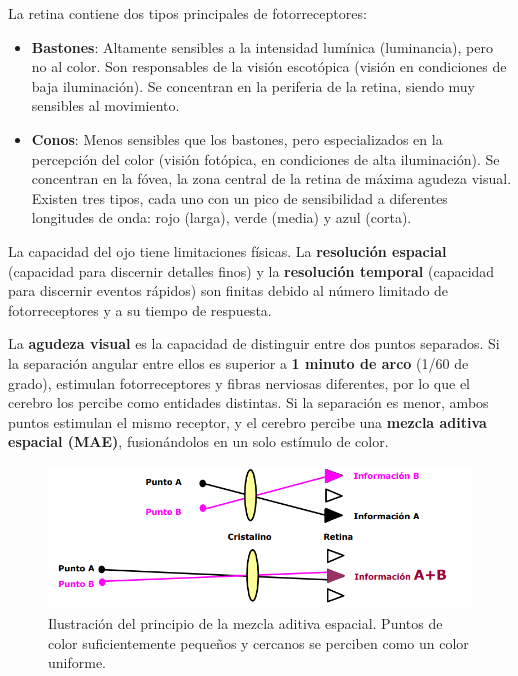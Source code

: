 La retina contiene dos tipos principales de fotorreceptores:
\begin{itemize}
\item \textbf{Bastones}: Altamente sensibles a la intensidad lumínica (luminancia), pero no al color. Son responsables de la visión escotópica (visión en condiciones de baja iluminación). Se concentran en la periferia de la retina, siendo muy sensibles al movimiento.
\item \textbf{Conos}: Menos sensibles que los bastones, pero especializados en la percepción del color (visión fotópica, en condiciones de alta iluminación). Se concentran en la fóvea, la zona central de la retina de máxima agudeza visual. Existen tres tipos, cada uno con un pico de sensibilidad a diferentes longitudes de onda: rojo (larga), verde (media) y azul (corta).
\end{itemize}

La capacidad del ojo tiene limitaciones físicas. La \textbf{resolución espacial} (capacidad para discernir detalles finos) y la \textbf{resolución temporal} (capacidad para discernir eventos rápidos) son finitas debido al número limitado de fotorreceptores y a su tiempo de respuesta.

La \textbf{agudeza visual} es la capacidad de distinguir entre dos puntos separados. Si la separación angular entre ellos es superior a \textbf{1 minuto de arco} (1/60 de grado), estimulan fotorreceptores y fibras nerviosas diferentes, por lo que el cerebro los percibe como entidades distintas. Si la separación es menor, ambos puntos estimulan el mismo receptor, y el cerebro percibe una \textbf{mezcla aditiva espacial (MAE)}, fusionándolos en un solo estímulo de color.

\begin{figure}[h]
\centering
\includegraphics[width = \textwidth]{figs/mae.png}
\caption{Ilustración del principio de la mezcla aditiva espacial. Puntos de color suficientemente pequeños y cercanos se perciben como un color uniforme.}
\end{figure}

